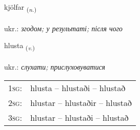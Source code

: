 \documentclass[frontgrid, backgrid]{flacards}\usepackage[]{graphicx}\usepackage[]{xcolor}
\begin{document}
\renewcommand{\flhead}{\vskip5pt \fboxsep=0pt {\small\bfseries\footnotesize Nafnorð | іменник}}
\renewcommand{\fcfoot}{\vskip5pt \fboxsep=0pt \hspace{2pt}{\small\bfseries\footnotesize 1K}}

\renewcommand{\blhead}{\vskip5pt {\small\bfseries\footnotesize Nafnorð | іменник }}
\renewcommand{\bcfoot}{\vskip5pt \hspace{2pt}{\small\bfseries\footnotesize 1K}}


{kjölfar \small{\textsubscript{(\textit{n.})}} \\[1ex] %
\textphonetic{[cʰœlfar]} \\
ukr.: \emph{згодом; у результаті; після чого} \\  [2ex]
\renewcommand*{\arraystretch}{0.8}
}

\renewcommand{\flhead}{\vskip5pt \fboxsep=0pt {\small\bfseries\footnotesize Sagnorð | дієслово}}
\renewcommand{\fcfoot}{\vskip5pt \fboxsep=0pt \hspace{2pt}{\small\bfseries\footnotesize 1K}}

\renewcommand{\blhead}{\vskip5pt {\small\bfseries\footnotesize Sagnorð | дієслово }}
\renewcommand{\bcfoot}{\vskip5pt \hspace{2pt}{\small\bfseries\footnotesize 1K}}


{hlusta \small{\textsubscript{(\textit{v.})}} \\[1ex] %
\textphonetic{[l̥ʏsta]} \\
ukr.: \emph{слухати; прислуховуватися} \\  [2ex]
\renewcommand*{\arraystretch}{0.8}
\begin{tabular}{p{1cm}l}
\textsc{1sg}: & hlusta -- hlustaði -- hlustað \\ 
\textsc{2sg}: & hlustar -- hlustaðir -- hlustað \\ 
\textsc{3sg}: & hlustar -- hlustaði -- hlustað \\ 
\end{tabular}
}
\end{document}
